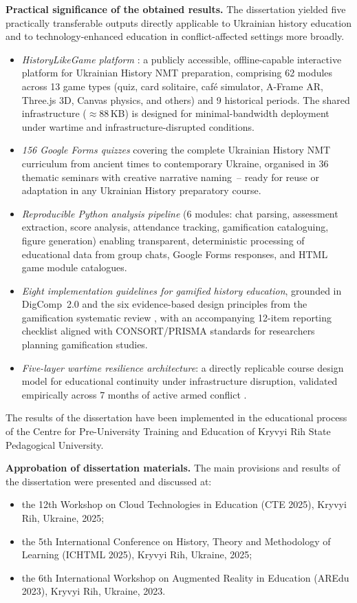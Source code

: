 {\textbf{Practical significance of the obtained results.}
The dissertation yielded five practically transferable outputs directly applicable to
Ukrainian history education and to technology-enhanced education in conflict-affected
settings more broadly.
\begin{itemize}
\item \emph{HistoryLikeGame platform} \cite{Korniienko2024hlg}: a publicly accessible,
  offline-capable interactive platform for Ukrainian History NMT preparation,
  comprising 62 modules across 13 game types (quiz, card solitaire, caf\'{e} simulator,
  A-Frame AR, Three.js 3D, Canvas physics, and others) and 9 historical periods.
  The shared infrastructure ($\approx$88\,KB) is designed for minimal-bandwidth deployment
  under wartime and infrastructure-disrupted conditions.
\item \emph{156 Google Forms quizzes} covering the complete Ukrainian History NMT
  curriculum from ancient times to contemporary Ukraine, organised in 36 thematic
  seminars with creative narrative naming~-- ready for reuse or adaptation in any
  Ukrainian History preparatory course.
\item \emph{Reproducible Python analysis pipeline} (6 modules: chat parsing, assessment
  extraction, score analysis, attendance tracking, gamification cataloguing, figure
  generation) enabling transparent, deterministic processing of educational data from
  group chats, Google Forms responses, and HTML game module catalogues.
\item \emph{Eight implementation guidelines for gamified history education}, grounded in
  DigComp~2.0 \cite{Vuorikari2016, Titova2025cte} and the six evidence-based design
  principles from the gamification systematic review \cite{KorniienkoSemerikov2024}, with
  an accompanying 12-item reporting checklist aligned with CONSORT/PRISMA standards
  \cite{Schulz2010CONSORT, Page2021} for researchers planning gamification studies.
\item \emph{Five-layer wartime resilience architecture}: a directly replicable course
  design model for educational continuity under infrastructure disruption, validated
  empirically across 7 months of active armed conflict \cite{Burde2017, UNESCO2023}.
\end{itemize}
The results of the dissertation have been implemented in the educational process of the
Centre for Pre-University Training and Education of Kryvyi Rih State Pedagogical
University.

\textbf{Approbation of dissertation materials.} The main provisions and results of the dissertation were presented and discussed at:
\begin{itemize}
\item the 12th Workshop on Cloud Technologies in Education (CTE 2025), Kryvyi Rih, Ukraine, 2025;
\item the 5th International Conference on History, Theory and Methodology of Learning (ICHTML 2025), Kryvyi Rih, Ukraine, 2025;
\item the 6th International Workshop on Augmented Reality in Education (AREdu 2023), Kryvyi Rih, Ukraine, 2023.
\end{itemize}

}
